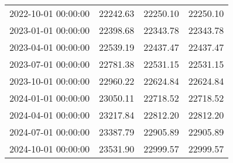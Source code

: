 \begin{table}[H]
\begin{tabular}{|c|c|c|c|}
        2022-10-01 00:00:00 & 22242.63     & 22250.10       & 22250.10        \\
        2023-01-01 00:00:00 & 22398.68     & 22343.78       & 22343.78        \\
        2023-04-01 00:00:00 & 22539.19     & 22437.47       & 22437.47        \\
        2023-07-01 00:00:00 & 22781.38     & 22531.15       & 22531.15        \\
        2023-10-01 00:00:00 & 22960.22     & 22624.84       & 22624.84        \\
        2024-01-01 00:00:00 & 23050.11     & 22718.52       & 22718.52        \\
        2024-04-01 00:00:00 & 23217.84     & 22812.20       & 22812.20        \\
        2024-07-01 00:00:00 & 23387.79     & 22905.89       & 22905.89        \\
        2024-10-01 00:00:00 & 23531.90     & 22999.57       & 22999.57        \\
        \hline
    \end{tabular}
\end{table}
